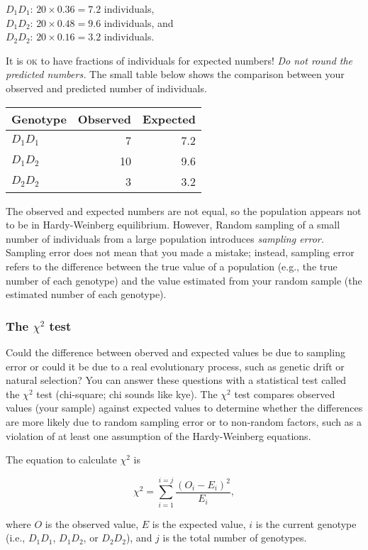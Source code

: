 \documentclass[12pt]{exam}
\begin{document}
\begin{questions}
$D_1D_1$: $20 \times 0.36 = 7.2$ individuals,\\
$D_1D_2$: $20 \times 0.48 = 9.6$ individuals, and\\
$D_2D_2$: $20 \times 0.16 = 3.2$ individuals.

It is \textsc{ok} to have fractions of individuals for expected numbers! \emph{Do not round the predicted numbers.} The small table below shows the comparison between your observed and predicted number of individuals.

\begin{longtable}{lrr}
	\toprule
	Genotype	& Observed	& Expected \tabularnewline
	\midrule
	$D_1D_1$ & 7  & 7.2 \tabularnewline
	$D_1D_2$ & 10 & 9.6 \tabularnewline
	$D_2D_2$ & 3  & 3.2 \tabularnewline
	\bottomrule
\end{longtable}	

The observed and expected numbers are not equal, so the population appears not to be in Hardy-Weinberg equilibrium. However, Random sampling of a small number of individuals from a large population introduces \emph{sampling error.} Sampling error does not mean that you made a mistake; instead, sampling error refers to the difference between the true value of a population (e.g., the true number of each genotype) and the value estimated from your random sample (the estimated number of each genotype). 

\subsubsection*{The $\chi^2$ test}

Could the difference between oberved and expected values be due to sampling error or could it be due to a real evolutionary process, such as genetic drift or natural selection? You can answer these questions with a statistical test called the $\chi^2$ test (chi-square; chi sounds like kye). The $\chi^2$ test compares observed values (your sample) against expected values to determine whether the differences are more likely due to random sampling error or to non-random factors, such as a violation of at least one assumption of the Hardy-Weinberg equations.
 
The equation to calculate $\chi^2$ is 

\[\chi^2 = \sum_{i=1}^{i=j}\frac{(O_i - E_i)^2}{E_i}, \]

where $O$ is the observed value, $E$ is the expected value, $i$ is the current genotype (i.e., $D_1D_1$, $ D_1D_2$, or $D_2D_2$), and $j$ is the total number of genotypes. 


\end{questions}
\end{document}
